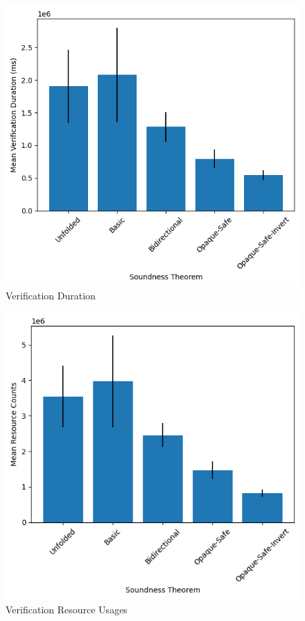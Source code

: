 \documentclass[sigplan,review,screen,anonymous]{acmart}
\begin{document}
\begin{figure}
  \includegraphics[scale=0.5]{durgraph.png}
  \caption{Verification Duration}
  \label{fig:dur-results}
\end{figure}

\begin{figure}
  \includegraphics[scale=0.5]{costgraph.png}
  \caption{Verification Resource Usages}
  \label{fig:cost-results}
\end{figure}
\end{document}
